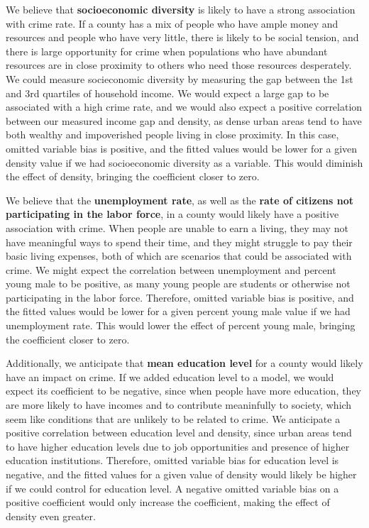 \documentclass[]{article}
\begin{document}
We believe that \textbf{socioeconomic diversity} is likely to have a
strong association with crime rate. If a county has a mix of people who
have ample money and resources and people who have very little, there is
likely to be social tension, and there is large opportunity for crime
when populations who have abundant resources are in close proximity to
others who need those resources desperately. We could measure
socieconomic diversity by measuring the gap between the 1st and 3rd
quartiles of household income. We would expect a large gap to be
associated with a high crime rate, and we would also expect a positive
correlation between our measured income gap and density, as dense urban
areas tend to have both wealthy and impoverished people living in close
proximity. In this case, omitted variable bias is positive, and the
fitted values would be lower for a given density value if we had
socioeconomic diversity as a variable. This would diminish the effect of
density, bringing the coefficient closer to zero.

We believe that the \textbf{unemployment rate}, as well as the
\textbf{rate of citizens not participating in the labor force}, in a
county would likely have a positive association with crime. When people
are unable to earn a living, they may not have meaningful ways to spend
their time, and they might struggle to pay their basic living expenses,
both of which are scenarios that could be associated with crime. We
might expect the correlation between unemployment and percent young male
to be positive, as many young people are students or otherwise not
participating in the labor force. Therefore, omitted variable bias is
positive, and the fitted values would be lower for a given percent young
male value if we had unemployment rate. This would lower the effect of
percent young male, bringing the coefficient closer to zero.

Additionally, we anticipate that \textbf{mean education level} for a
county would likely have an impact on crime. If we added education level
to a model, we would expect its coefficient to be negative, since when
people have more education, they are more likely to have incomes and to
contribute meaninfully to society, which seem like conditions that are
unlikely to be related to crime. We anticipate a positive correlation
between education level and density, since urban areas tend to have
higher education levels due to job opportunities and presence of higher
education institutions. Therefore, omitted variable bias for education
level is negative, and the fitted values for a given value of density
would likely be higher if we could control for education level. A
negative omitted variable bias on a positive coefficient would only
increase the coefficient, making the effect of density even greater.
\end{document}
